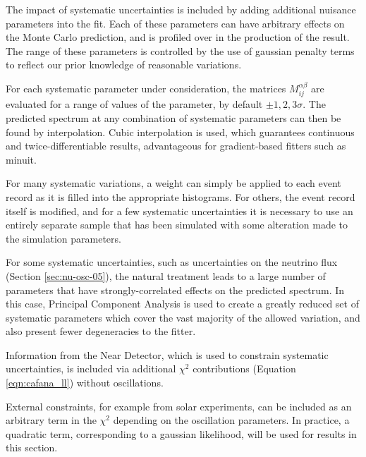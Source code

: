 The impact of systematic uncertainties is included by adding additional nuisance parameters into the fit. Each of these parameters can have arbitrary effects on the Monte Carlo prediction, and is profiled over in the production of the result. The range of these parameters is controlled by the use of gaussian penalty terms to reflect our prior knowledge of reasonable variations.

For each systematic parameter under consideration, the matrices $M_{ij}^{\alpha\beta}$ are evaluated for a range of values of the parameter, by default $\pm1,2,3\sigma$. The predicted spectrum at any combination of systematic parameters can then be found by interpolation. Cubic interpolation is used, which guarantees continuous and twice-differentiable results, advantageous for gradient-based fitters such as {\sc minuit}. %

For many systematic variations, a weight can simply be applied to each event record as it is filled into the appropriate histograms. For others, the event record itself is modified, and for a few systematic uncertainties it is necessary to use an entirely separate sample that has been simulated with some alteration made to the simulation parameters.

For some systematic uncertainties, such as uncertainties on the neutrino flux (Section \ref{sec:nu-osc-05}), the natural treatment leads to a large number of parameters that have strongly-correlated effects on the predicted spectrum. In this case, Principal Component Analysis is used to create a greatly reduced set of systematic parameters which cover the vast majority of the allowed variation, and also present fewer degeneracies to the fitter.

Information from the Near Detector, which is used to constrain systematic uncertainties, is included via additional $\chi^2$ contributions (Equation \ref{eqn:cafana_ll}) without oscillations. 

External constraints, for example from solar experiments, can be included as an arbitrary term in the $\chi^2$ depending on the oscillation parameters. In practice, a quadratic term, corresponding to a gaussian likelihood, will be used for results in this section.


